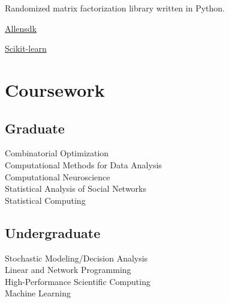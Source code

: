 \documentclass[]{deedy-resume-openfont}
\begin{document}
\begin{minipage}[t]{0.35\textwidth}
Randomized matrix factorization library written in Python.
\sectionsep

\vspace{\topsep}
\begin{tightemize}
\item \href{https://github.com/alleninstitute/allensdk}{Allensdk}
\item \href{https://github.com/scikit-learn/scikit-learn}{Scikit-learn}
\end{tightemize}
\sectionsep



\section{Coursework}
\subsection{Graduate}
Combinatorial Optimization \\
Computational Methods for Data Analysis \\
Computational Neuroscience \\
Statistical Analysis of Social Networks \\
Statistical Computing
\sectionsep

\subsection{Undergraduate}
Stochastic Modeling/Decision Analysis \\
Linear and Network Programming \\
High-Performance Scientific Computing \\
Machine Learning


\end{minipage}
\hfill
\end{document}
